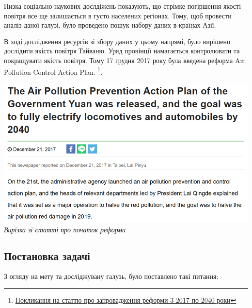 \documentclass{article}
\begin{document}
Низка соціально-наукових дослдіжень показують, що стрімке погіршення якості повітря все ще залишається в густо населених регіонах. Тому, щоб провести аналіз даної галузі, було проведено пошук набору даних в країнах Азії.

В ході дослідження ресурсів зі збору даних у цьому напрямі, було вирішено дослідити якість повітря Тайваню. Уряд провінції намагається контролювати та покращувати якість повітря. Тому 17 грудня 2017 року була введена  реформа Air Pollution Control Action Plan. \footnote{\href{https://e-info.org.tw/node/209138}{Покликання на статтю про запровадження реформи 3 2017 по 2040 роки}}.

\begin{center}
  \includegraphics[height=3in]{notes/media/air_quality_reform_news.png}\\
  \textit{Вирізка зі статті про початок реформи}
\end{center}

\subsection{Постановка задачі}
З огляду на мету та досліджувану галузь, було поставлено такі питання:
\end{document}
